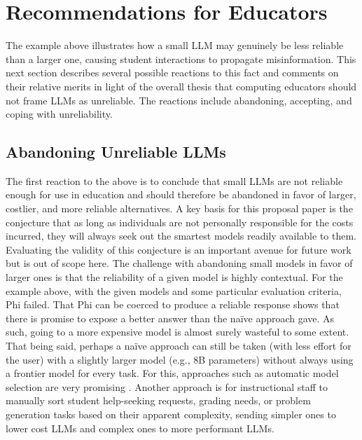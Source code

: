 \section{Recommendations for Educators}\label{recommendations-for-educators}

The example above illustrates how a small LLM may genuinely be less reliable than a larger one, causing student interactions to propagate misinformation. This next section describes several possible reactions to this fact and comments on their relative merits in light of the overall thesis that computing educators should not frame LLMs as unreliable. The reactions include abandoning, accepting, and coping with unreliability.

\subsection{Abandoning Unreliable LLMs}\label{abandoning-unreliable-llms}

The first reaction to the  above is to conclude that small LLMs are not reliable enough for use in education and should therefore be abandoned in favor of larger, costlier, and more reliable alternatives. A key basis for this proposal paper is the conjecture that as long as individuals are not personally responsible for the costs incurred, they will always seek out the smartest models readily available to them. Evaluating the validity of this conjecture is an important avenue for future work but is out of scope here. The challenge with abandoning small models in favor of larger ones is that the reliability of a given model is highly contextual. For the example above, with the given models and some particular evaluation criteria, Phi failed. That Phi can be coerced to produce a reliable response shows that there is promise to expose a better answer than the naïve approach gave. As such, going to a more expensive model is almost surely wasteful to some extent. That being said, perhaps a naïve approach can still be taken (with less effort for the user) with a slightly larger model (e.g., 8B parameters) without always using a frontier model for every task. For this, approaches such as automatic model selection are very promising \cite{dingHybridLlmCostefficient2024,CopilotAutoModel,moslemDynamicModelRouting2026}. Another approach is for instructional staff to manually sort student help-seeking requests, grading needs, or problem generation tasks based on their apparent complexity, sending simpler ones to lower cost LLMs and complex ones to more performant LLMs.

